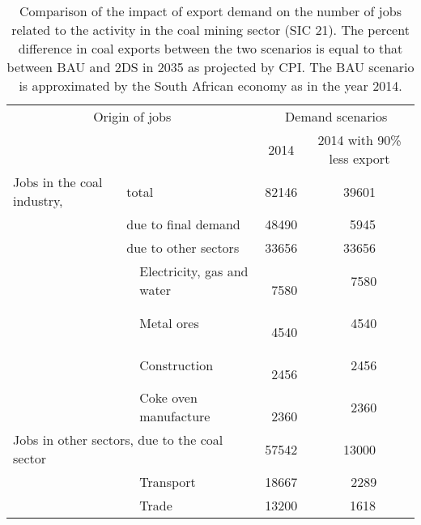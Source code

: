 \documentclass[12pt,english]{article}
\begin{document}
\begin{table}[ht]
	\centering
	\begin{tabular}{lp{20pt}lcc}
		\multicolumn{3}{c}{Origin of jobs} &\multicolumn{2}{c}{Demand scenarios}   \\ 
		\multicolumn{3}{c}{} & 2014 & 2014 with 90\% less export \\ 
		\midrule
		Jobs in the coal industry,	& \multicolumn{2}{l}{total}  & 82146 & 39601 \\ 
		& \multicolumn{2}{l}{due to final demand}  & 48490 & \, 5945 \\ 
		
		& \multicolumn{2}{l}{due to other sectors}  & 33656 & 33656 \\ 
						& 	 & Electricity, gas and water & \,\ 7580  & \,\ 7580 \\ 
						&    & Metal ores& \,\ 4540  & \,\ 4540 \\ 
						&    & Construction& \,\ 2456  & \,\ 2456  \\ 														
						&    & Coke oven manufacture& \,\ 2360  & \,\ 2360   \\ 
		\midrule
		\multicolumn{3}{l}{Jobs in other sectors, due to the coal sector}  & 57542 &  13000 \\ 
		& 						 & Transport & 18667 &  \ \,2289 \\ 
		& 						 & Trade & 13200 &  \  1618 \\ 
		\bottomrule
	\end{tabular}
	\caption{\label{coalExport_BAUvs2DS_2035}Comparison of the impact of export demand on the number of jobs related to the activity in the coal mining sector (SIC 21). The percent difference in coal exports between the two scenarios is equal to that between BAU and 2DS in 2035 as projected by CPI. The BAU scenario is approximated by the South African economy as in the year 2014.}
\end{table}
\end{document}
